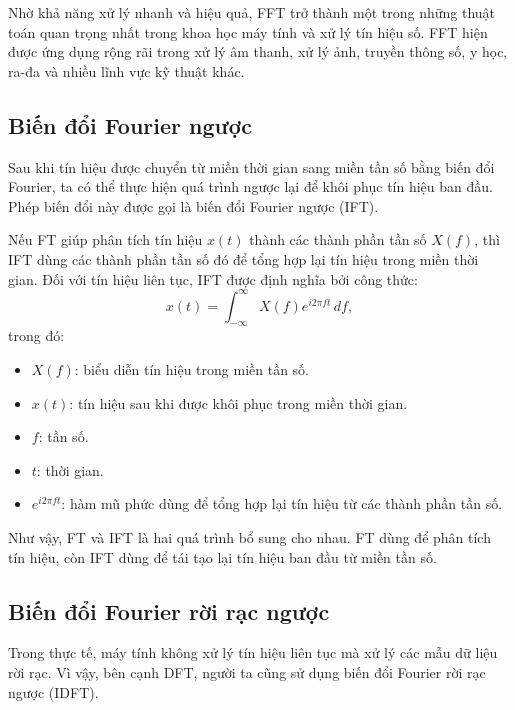 Nhờ khả năng xử lý nhanh và hiệu quả, FFT trở thành một trong những thuật toán
quan trọng nhất trong khoa học máy tính và xử lý tín hiệu số. FFT hiện được
ứng dụng rộng rãi trong xử lý âm thanh, xử lý ảnh, truyền thông số, y học,
ra-đa và nhiều lĩnh vực kỹ thuật khác.

\subsection{Biến đổi Fourier ngược}

Sau khi tín hiệu được chuyển từ miền thời gian sang miền tần số bằng biến đổi
Fourier, ta có thể thực hiện quá trình ngược lại để khôi phục tín hiệu ban đầu.
Phép biến đổi này được gọi là biến đổi Fourier ngược (IFT).

Nếu FT giúp phân tích tín hiệu $x(t)$ thành các thành phần tần số $X(f)$, thì
IFT dùng các thành phần tần số đó để tổng hợp lại tín hiệu trong miền thời
gian. Đối với tín hiệu liên tục, IFT được định nghĩa bởi công thức:
\begin{equation}
  x(t)=\int_{-\infty}^{\infty}X(f)e^{i2\pi ft}\,df,
\end{equation}
trong đó:
\begin{itemize}
    \item $X(f)$: biểu diễn tín hiệu trong miền tần số.
    \item $x(t)$: tín hiệu sau khi được khôi phục trong miền thời gian.
    \item $f$: tần số.
    \item $t$: thời gian.
    \item $e^{i2\pi ft}$: hàm mũ phức dùng để tổng hợp lại tín hiệu từ các
    thành phần tần số.
\end{itemize}

Như vậy, FT và IFT là hai quá trình bổ sung cho nhau. FT dùng để phân tích tín
hiệu, còn IFT dùng để tái tạo lại tín hiệu ban đầu từ miền tần số.

\subsection{Biến đổi Fourier rời rạc ngược}

Trong thực tế, máy tính không xử lý tín hiệu liên tục mà xử lý các mẫu dữ liệu
rời rạc. Vì vậy, bên cạnh DFT, người ta cũng sử dụng biến đổi Fourier rời rạc
ngược (IDFT).

